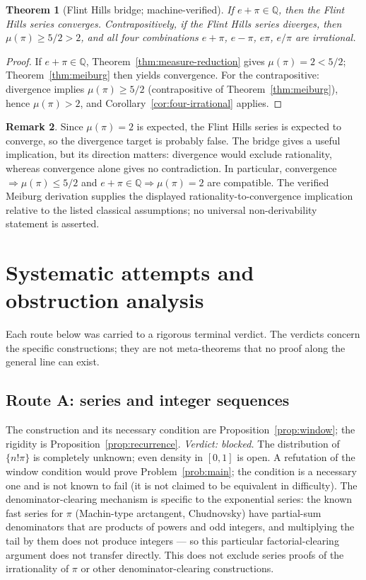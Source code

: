 \documentclass[11pt]{amsart}
\newtheorem{theorem}{Theorem}[section]
\theoremstyle{definition}
\newtheorem{remark}[theorem]{Remark}
\theoremstyle{remark}
\numberwithin{equation}{section}
\newcommand{\Q}{\mathbb{Q}}
\newcommand{\irr}{\mu}
\begin{document}
\begin{theorem}[Flint Hills bridge; machine-verified]\label{thm:flint}
If $e+\pi\in\Q$, then the Flint Hills series converges. Contrapositively, if the Flint Hills series diverges, then $\irr(\pi)\ge5/2>2$, and all four combinations $e+\pi$, $e-\pi$, $e\pi$, $e/\pi$ are irrational.
\end{theorem}

\begin{proof}
If $e+\pi\in\Q$, Theorem~\ref{thm:measure-reduction} gives $\irr(\pi)=2<5/2$; Theorem~\ref{thm:meiburg} then yields convergence. For the contrapositive: divergence implies $\irr(\pi)\ge5/2$ (contrapositive of Theorem~\ref{thm:meiburg}), hence $\irr(\pi)>2$, and Corollary~\ref{cor:four-irrational} applies.
\end{proof}

\begin{remark}
Since $\irr(\pi)=2$ is expected, the Flint Hills series is expected to converge, so the divergence target is probably false. The bridge gives a useful implication, but its direction matters: divergence would exclude rationality, whereas convergence alone gives no contradiction. In particular, convergence $\Rightarrow\irr(\pi)\le5/2$ and $e+\pi\in\Q\Rightarrow\irr(\pi)=2$ are compatible. The verified Meiburg derivation supplies the displayed rationality-to-convergence implication relative to the listed classical assumptions; no universal non-derivability statement is asserted.
\end{remark}

\section{Systematic attempts and obstruction analysis}\label{sec:obstructions}

Each route below was carried to a rigorous terminal verdict. The verdicts concern the specific constructions; they are not meta-theorems that no proof along the general line can exist.

\subsection{Route A: series and integer sequences}

The construction and its necessary condition are Proposition~\ref{prop:window}; the rigidity is Proposition~\ref{prop:recurrence}. \emph{Verdict: blocked.} The distribution of $\{n!\pi\}$ is completely unknown; even density in $[0,1]$ is open. A refutation of the window condition would prove Problem~\ref{prob:main}; the condition is a necessary one and is not known to fail (it is not claimed to be equivalent in difficulty). The denominator-clearing mechanism is specific to the exponential series: the known fast series for $\pi$ (Machin-type arctangent, Chudnovsky) have partial-sum denominators that are products of powers and odd integers, and multiplying the tail by them does not produce integers --- so this particular factorial-clearing argument does not transfer directly. This does not exclude series proofs of the irrationality of $\pi$ or other denominator-clearing constructions.
\end{document}
